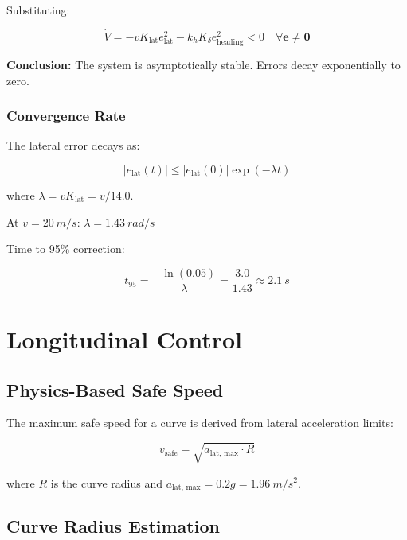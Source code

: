 \documentclass[11pt,a4paper]{article}
\begin{document}
Substituting:

\begin{equation}
\dot{V} = -v K_{\text{lat}} e_{\text{lat}}^2 - k_h K_\delta e_{\text{heading}}^2 < 0 \quad \forall \mathbf{e} \neq \mathbf{0}
\end{equation}

\textbf{Conclusion:} The system is asymptotically stable. Errors decay exponentially to zero.

\subsubsection{Convergence Rate}

The lateral error decays as:

\begin{equation}
|e_{\text{lat}}(t)| \leq |e_{\text{lat}}(0)| \exp(-\lambda t)
\end{equation}

where $\lambda = v K_{\text{lat}} = v / 14.0$.

At $v = \SI{20}{m/s}$: $\lambda = \SI{1.43}{rad/s}$

Time to 95\% correction:

\begin{equation}
t_{95} = \frac{-\ln(0.05)}{\lambda} = \frac{3.0}{1.43} \approx \SI{2.1}{s}
\end{equation}

\section{Longitudinal Control}

\subsection{Physics-Based Safe Speed}

The maximum safe speed for a curve is derived from lateral acceleration limits:

\begin{equation}
v_{\text{safe}} = \sqrt{a_{\text{lat, max}} \cdot R}
\end{equation}

where $R$ is the curve radius and $a_{\text{lat, max}} = 0.2g = \SI{1.96}{m/s^2}$.

\subsection{Curve Radius Estimation}
\end{document}
